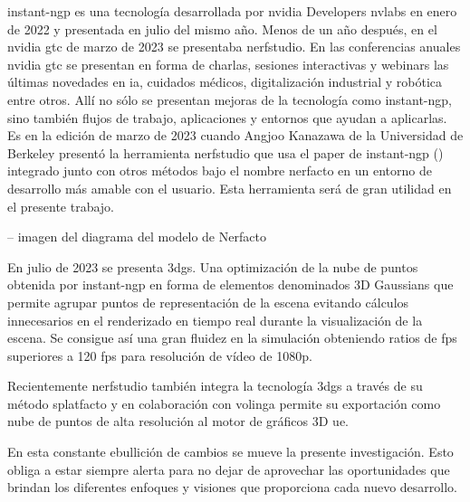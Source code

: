 \documentclass[a4paper, 12pt, spanish, twoside]{article}
\begin{document}
\Gls{instant-ngp} es una tecnología desarrollada por \gls{nvidia} Developers \gls{nvlabs} en enero de 2022 y presentada en julio del mismo año. Menos de un año después, en el \gls{nvidia} \acrshort{gtc} de marzo de 2023 se presentaba \gls{nerfstudio}. En las conferencias anuales \gls{nvidia} \acrshort{gtc} se presentan en forma de charlas, sesiones interactivas y \glspl{webinar} las últimas novedades en \acrshort{ia}, cuidados médicos, digitalización industrial y robótica entre otros. Allí no sólo se presentan mejoras de la tecnología como \gls{instant-ngp}, sino también flujos de trabajo, aplicaciones y entornos que ayudan a aplicarlas. Es en la edición de marzo de 2023 cuando Angjoo Kanazawa de la Universidad de Berkeley presentó la herramienta \gls{nerfstudio} que usa el paper de \gls{instant-ngp} (\cite{nerfstudio}) integrado junto con otros métodos bajo el nombre \gls{nerfacto} en un entorno de desarrollo más amable con el usuario. Esta herramienta será de gran utilidad en el presente trabajo. 

-- imagen del diagrama del modelo de Nerfacto 

En julio de 2023 se presenta \acrshort{3dgs}. Una optimización de la nube de puntos obtenida por \gls{instant-ngp} en forma de elementos denominados 3D Gaussians que permite agrupar puntos de representación de la escena evitando cálculos innecesarios en el renderizado en tiempo real durante la visualización de la escena. Se consigue así una gran fluidez en la simulación obteniendo ratios de \acrfull{fps} superiores a 120 \acrshort{fps} para resolución de vídeo de 1080p.  

Recientemente \gls{nerfstudio} también integra la tecnología \acrshort{3dgs} a través de su método \gls{splatfacto} y en colaboración con \gls{volinga} permite su exportación como nube de puntos de alta resolución al motor de gráficos 3D \acrfull{ue}. 

En esta constante ebullición de cambios se mueve la presente investigación. Esto obliga a estar siempre alerta para no dejar de aprovechar las oportunidades que brindan los diferentes enfoques y visiones que proporciona cada nuevo desarrollo. 




\clearpage
\end{document}

